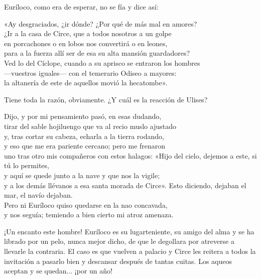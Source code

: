Euríloco, como era de esperar, no se fía y dice así:

\begin{versocita}
«Ay desgraciados, ¿ir dónde? ¿Por qué de más mal en amores?\\
¿Ir a la casa de Circe, que a todos nosotros a un golpe\\
en porcachones o en lobos nos convertirá o en leones,\\
para a la fuerza allí ser de esa su alta mansión guardadores?\\
Ved lo del Cíclope, cuando a su aprisco se entraron los hombres\\
---vuestros iguales--- con el temerario Odiseo a mayores:\\
la altanería de este de aquellos movió la hecatombe».
\end{versocita}

Tiene toda la razón, obviamente. ¿Y cuál es la reacción de Ulises?

\begin{versocita}
Dijo, y por mi pensamiento pasó, en esas dudando,\\
tirar del sable hojiluengo que va al recio muslo ajustado\\
y, tras cortar su cabeza, echarla a la tierra rodando,\\
y eso que me era pariente cercano; pero me frenaron\\
uno tras otro mis compañeros con estos halagos:
\stanzabreak
«Hijo del cielo, dejemos a este, si tú lo permites,\\
y aquí se quede junto a la nave y que nos la vigile;\\
y a los demás llévanos a esa santa morada de Circe».
\stanzabreak
Esto diciendo, dejaban el mar, el navío dejaban.\\
Pero ni Euríloco quiso quedarse en la nao concavada,\\
y nos seguía; temiendo a bien cierto mi atroz amenaza.
\end{versocita}

¡Un encanto este hombre! Euríloco es su lugarteniente, su amigo del alma y se ha librado por un pelo, nunca mejor dicho, de que le degollara por atreverse a llevarle la contraria. El caso es que vuelven a palacio y Circe les reitera a todos la invitación a pasarlo bien y descansar después de tantas cuitas. Los aqueos aceptan y se quedan... ¡por un año!
